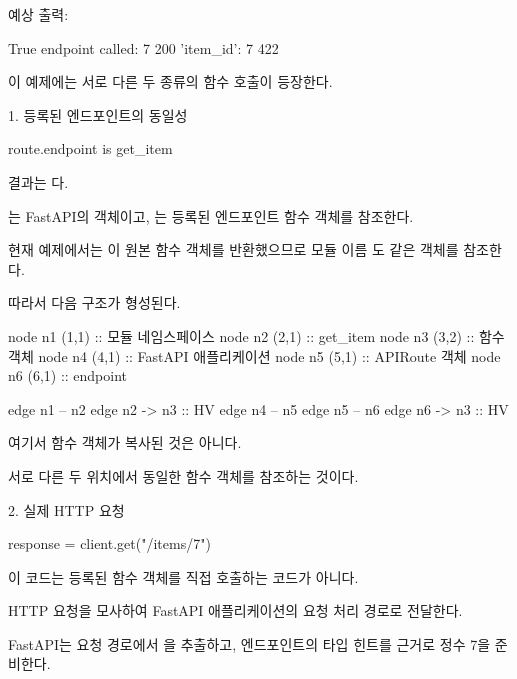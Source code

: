 예상 출력:

\begin{dhkzsh}
True
endpoint called: 7
200
{'item_id': 7}
422
\end{dhkzsh}

이 예제에는 서로 다른 두 종류의 함수 호출이 등장한다.

\begin{dhknote}
\begin{dhksmry}[centered]
1. 등록된 엔드포인트의 동일성
\end{dhksmry}
\end{dhknote}

\begin{dhkcode}
route.endpoint is get_item
\end{dhkcode}

결과는 다.

는 FastAPI의  객체이고, 는 등록된 엔드포인트 함수 객체를 참조한다.

현재 예제에서는 이 원본 함수 객체를 반환했으므로 모듈 이름 도 같은 객체를 참조한다.

따라서 다음 구조가 형성된다.

\begin{dhkdiagram}[in=6]
node n1 (1,1) :: 모듈 네임스페이스
node n2 (2,1) :: get_item
node n3 (3,2) :: 함수 객체
node n4 (4,1) :: FastAPI 애플리케이션
node n5 (5,1) :: APIRoute 객체
node n6 (6,1) :: endpoint

edge n1 -- n2
edge n2 -> n3 :: HV
edge n4 -- n5
edge n5 -- n6
edge n6 -> n3 :: HV
\end{dhkdiagram}

여기서 함수 객체가 복사된 것은 아니다.

서로 다른 두 위치에서 동일한 함수 객체를 참조하는 것이다.

\begin{dhknote}
\begin{dhksmry}[centered]
2. 실제 HTTP 요청
\end{dhksmry}
\end{dhknote}

\begin{dhkcode}
response = client.get("/items/7")
\end{dhkcode}

이 코드는 등록된 함수 객체를 직접 호출하는 코드가 아니다.

HTTP 요청을 모사하여 FastAPI 애플리케이션의 요청 처리 경로로 전달한다.

FastAPI는 요청 경로에서 을 추출하고, 엔드포인트의 타입 힌트를 근거로 정수 7을 준비한다.

